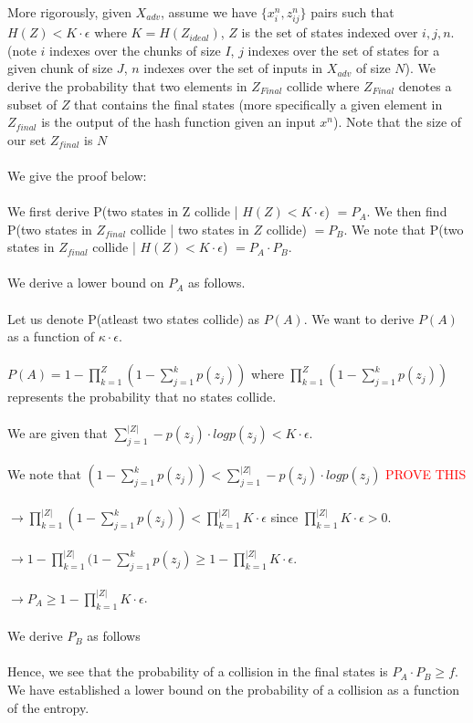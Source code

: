 More rigorously, given $X_{adv}$, assume we have $\{x_{i}^{n}, z_{ij}^{n}\}$ pairs such that $H(Z) < K \cdot \epsilon$ where $K = H(Z_{ideal})$, $Z$ is the set of states indexed over $i, j, n$. (note $i$ indexes over the chunks of size $I$, $j$ indexes over the set of states for a given chunk of size $J$, $n$ indexes over the set of inputs in $X_{adv}$ of size $N$). We derive the probability that two elements in $Z_{Final}$ collide where $Z_{Final}$ denotes a subset of $Z$ that contains the final states (more specifically a given element in $Z_{final}$ is the output of the hash function given an input $x^{n}$). Note that the size of our set $Z_{final}$ is $N$ 
\\
\\
We give the proof below:
\\
\\
We first derive P(two states in Z collide | $H(Z) < K \cdot \epsilon$) $= P_{A}$. We then find P(two states in $Z_{final}$ collide | two states in $Z$ collide) $= P_{B}$. We note that P(two states in $Z_{final}$ collide |  $H(Z) < K \cdot \epsilon$) $=  P_{A} \cdot P_{B}$. 
\\
\\
We derive a lower bound on $P_{A}$ as follows.
\\
\\
Let us denote P(atleast two states collide) as $P(A)$. We want to derive $P(A)$ as a function of $\kappa \cdot \epsilon$. 
\\
\\
$P(A) = 1 - \prod_{k=1}^{Z} (1- \sum_{j=1}^{k} p(z_{j}))$ where $\prod_{k=1}^{Z} (1- \sum_{j=1}^{k} p(z_{j}))$ represents the probability that no states collide. 
\\
\\
We are given that $\sum_{j=1}^{|Z|} -p(z_{j}) \cdot log p(z_{j}) < K \cdot \epsilon$. 
\\
\\
We note that $(1 - \sum_{j=1}^{k} p(z_{j})) < \sum_{j=1}^{|Z|} -p(z_{j}) \cdot log p(z_{j})$ \textcolor{red}{PROVE THIS}
\\
\\
$\rightarrow \prod_{k=1}^{|Z|} (1 - \sum_{j=1}^{k} p(z_{j})) < \prod_{k=1}^{|Z|} K \cdot \epsilon$ since $\prod_{k=1}^{|Z|} K \cdot \epsilon > 0$. 
\\
\\
$\rightarrow 1 - \prod_{k=1}^{|Z|} (1 - \sum_{j=1}^{k} p(z_{j}) \geq 1 - \prod_{k=1}^{|Z|} K \cdot \epsilon$. 
\\
\\
$\rightarrow P_{A} \geq 1 - \prod_{k=1}^{|Z|} K \cdot \epsilon$. 
\\
\\
We derive $P_{B}$ as follows
\\
\\
Hence, we see that the probability of a collision in the final states is $P_{A} \cdot P_{B} \geq f$. We have established a lower bound on the probability of a collision as a function of the entropy.


